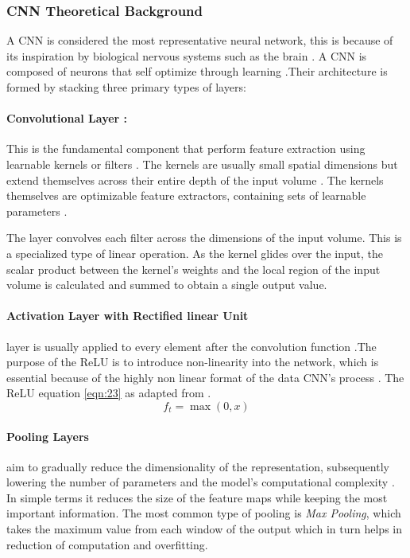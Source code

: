 \subsubsection{CNN Theoretical Background}

A CNN is considered the most representative neural network, this is because of its inspiration by biological nervous systems such as the brain \cite{o2015introduction}. A CNN is composed of neurons that self optimize through learning \cite{o2015introduction}.Their architecture is formed by stacking three primary types of layers:

\paragraph{Convolutional Layer :} This is the fundamental component that perform feature extraction using learnable kernels or filters \cite{yamashita2018convolutional}. The kernels are usually small spatial dimensions but extend themselves across their entire depth of the input volume \cite{ajit2020review}. The kernels themselves are optimizable feature extractors, containing sets of learnable parameters \cite{yamashita2018convolutional}.

The layer convolves each filter across the dimensions of the input volume. This is a specialized type of linear operation. As the kernel glides over the input, the scalar product  between the kernel's weights and the local region of the input volume is calculated and summed to obtain a single output value.

\paragraph{Activation Layer with  Rectified linear Unit} layer is usually applied to every element after the convolution function \cite{o2015introduction}.The purpose of the ReLU is to introduce non-linearity into the network, which is essential because of the highly non linear format of the data CNN's process \cite{wu2017introduction}. The ReLU equation \ref{eqn:23} as adapted from \cite{wu2017introduction}.
\[
f_t = \max (0,x)
\tag{30}
\label{eqn:23}
\]
\paragraph{Pooling Layers} aim to gradually reduce the dimensionality of the representation, subsequently lowering the number of parameters and the model's computational complexity \cite{li2021survey}. In simple terms it reduces the size of the feature maps while keeping the most important information. The most common type of pooling is \textit{Max Pooling}, which takes the maximum value from each window of the output  which in turn helps in reduction of computation and overfitting.


